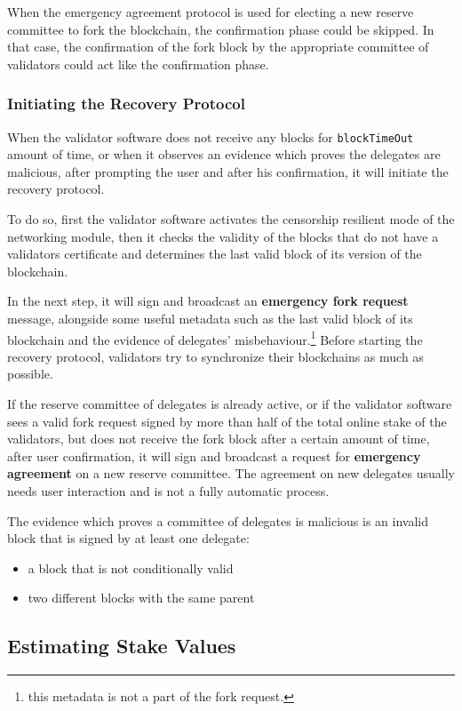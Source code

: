 When the emergency agreement protocol is used for electing a new reserve committee to fork the blockchain, the
confirmation phase could be skipped. In that case, the confirmation of the fork block by the appropriate committee
of validators could act like the confirmation phase.

\subsubsection{Initiating the Recovery Protocol}

When the validator software does not receive any blocks for \texttt{blockTimeOut} amount of time, or when it observes an
evidence which proves the delegates are malicious, after prompting the user and after his confirmation, it will
initiate the recovery protocol.

To do so, first the validator software activates the censorship resilient mode of the networking module, then it checks
the validity of the blocks that do not have a validators certificate and determines the last valid block of its
version of the blockchain.

In the next step, it will sign and broadcast an \textbf{emergency fork request} message, alongside some useful metadata
such as the last valid block of its blockchain and the evidence of delegates' misbehaviour.\footnote{this metadata is
not a part of the fork request.} Before starting the recovery protocol, validators try to synchronize their blockchains
as much as possible.

If the reserve committee of delegates is already active, or if the validator software sees a valid fork request signed
by more than half of the total online stake of the validators, but does not receive the fork
block after a certain amount of time, after user confirmation, it will sign and broadcast a request for
\textbf{emergency agreement} on a new reserve committee. The agreement on new delegates usually needs user
interaction and is not a fully automatic process.

The evidence which proves a committee of delegates is malicious is an invalid block that is signed by at least
one delegate:
\begin{itemize}
    \item a block that is not conditionally valid
    \item two different blocks with the same parent
\end{itemize}

\subsection{Estimating Stake Values}\label{subsec:user's-stake}

